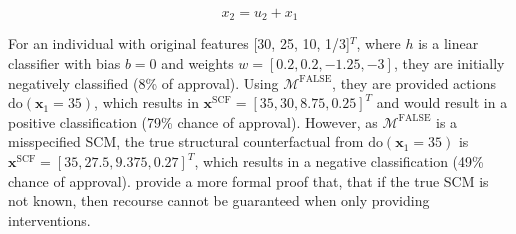 \begin{equation}
	x_2 = u_2 + x_1
\end{equation}

For an individual with original features [30, 25, 10, 1/3]$^T$, where $h$ is a linear classifier with bias $b=0$ and weights $w=[0.2, 0.2, -1.25, -3]$, they are initially negatively classified (8\% of approval). Using $\mathcal{M}^{\text{FALSE}}$, they are provided actions $\text{do}(\mathbf{x}_1=35)$, which results in $\mathbf{x}^{\text{SCF}} = [35, 30, 8.75, 0.25]^T$ and would result in a positive classification (79\% chance of approval). However, as $\mathcal{M}^{\text{FALSE}}$ is a misspecified SCM, the true structural counterfactual from $\text{do}(\mathbf{x}_1=35)$ is $\mathbf{x}^{\text{SCF}} = [35, 27.5, 9.375, 0.27]^T$, which results in a negative classification (49\% chance of approval). \textcite{karimiAlgorithmicRecourseImperfect2020} provide a more formal proof that, that if the true SCM is not known, then recourse cannot be guaranteed when only providing interventions. 










